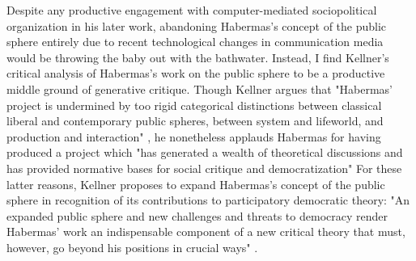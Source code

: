 Despite any productive engagement with computer-mediated sociopolitical organization in his later work, abandoning Habermas's concept of the public sphere entirely due to recent technological changes in communication media would be throwing the baby out with the bathwater. Instead, I find Kellner's critical analysis of Habermas's work on the public sphere to be a productive middle ground of generative critique. Though Kellner argues that "Habermas' project is undermined by too rigid categorical distinctions between classical liberal and contemporary public spheres, between system and lifeworld, and production and interaction" \autocite*[281--2]{Kellner00}, he nonetheless applauds Habermas for having produced a project which "has generated a wealth of theoretical discussions and has provided normative bases for social critique and democratization" \autocite[271]{Kellner00} For these latter reasons, Kellner proposes to expand Habermas's concept of the public sphere in recognition of its contributions to participatory democratic theory: "An expanded public sphere and new challenges and threats to democracy render Habermas' work an indispensable component of a new critical theory that must, however, go beyond his positions in crucial ways" \autocite[282]{Kellner00}.

